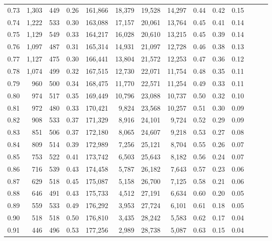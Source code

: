 \begin{tabular}{rrrrrrrrrrrrrr}
0.73 &  1,303 &    449 &  0.26 &  161,866 &   18,379 &  19,528 &  14,297 &  0.44 &  0.42 &      0.15 \\
0.74 &  1,222 &    533 &  0.30 &  163,088 &   17,157 &  20,061 &  13,764 &  0.45 &  0.41 &      0.14 \\
0.75 &  1,129 &    549 &  0.33 &  164,217 &   16,028 &  20,610 &  13,215 &  0.45 &  0.39 &      0.14 \\
0.76 &  1,097 &    487 &  0.31 &  165,314 &   14,931 &  21,097 &  12,728 &  0.46 &  0.38 &      0.13 \\
0.77 &  1,127 &    475 &  0.30 &  166,441 &   13,804 &  21,572 &  12,253 &  0.47 &  0.36 &      0.12 \\
0.78 &  1,074 &    499 &  0.32 &  167,515 &   12,730 &  22,071 &  11,754 &  0.48 &  0.35 &      0.11 \\
0.79 &    960 &    500 &  0.34 &  168,475 &   11,770 &  22,571 &  11,254 &  0.49 &  0.33 &      0.11 \\
0.80 &    974 &    517 &  0.35 &  169,449 &   10,796 &  23,088 &  10,737 &  0.50 &  0.32 &      0.10 \\
0.81 &    972 &    480 &  0.33 &  170,421 &    9,824 &  23,568 &  10,257 &  0.51 &  0.30 &      0.09 \\
0.82 &    908 &    533 &  0.37 &  171,329 &    8,916 &  24,101 &   9,724 &  0.52 &  0.29 &      0.09 \\
0.83 &    851 &    506 &  0.37 &  172,180 &    8,065 &  24,607 &   9,218 &  0.53 &  0.27 &      0.08 \\
0.84 &    809 &    514 &  0.39 &  172,989 &    7,256 &  25,121 &   8,704 &  0.55 &  0.26 &      0.07 \\
0.85 &    753 &    522 &  0.41 &  173,742 &    6,503 &  25,643 &   8,182 &  0.56 &  0.24 &      0.07 \\
0.86 &    716 &    539 &  0.43 &  174,458 &    5,787 &  26,182 &   7,643 &  0.57 &  0.23 &      0.06 \\
0.87 &    629 &    518 &  0.45 &  175,087 &    5,158 &  26,700 &   7,125 &  0.58 &  0.21 &      0.06 \\
0.88 &    646 &    491 &  0.43 &  175,733 &    4,512 &  27,191 &   6,634 &  0.60 &  0.20 &      0.05 \\
0.89 &    559 &    533 &  0.49 &  176,292 &    3,953 &  27,724 &   6,101 &  0.61 &  0.18 &      0.05 \\
0.90 &    518 &    518 &  0.50 &  176,810 &    3,435 &  28,242 &   5,583 &  0.62 &  0.17 &      0.04 \\
0.91 &    446 &    496 &  0.53 &  177,256 &    2,989 &  28,738 &   5,087 &  0.63 &  0.15 &      0.04 \\

\end{tabular}
